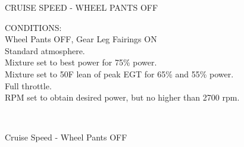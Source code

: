 \begin{figure}[t]
\begin{center}
\begin{perfhdr}CRUISE SPEED - WHEEL PANTS OFF\\
\end{perfhdr}

\begin{minipage}{5in}
  \begin{flushleft}
    CONDITIONS:\\
    Wheel Pants OFF, Gear Leg Fairings ON\\
    Standard atmosphere.\\
    Mixture set to best power for 75\% power.\\
    Mixture set to 50\textdegree F lean of peak EGT for 65\% and 55\% power.\\
    Full throttle.\\
    RPM set to obtain desired power, but no higher than 2700 rpm.\\
    \end{flushleft}
\end{minipage}\\
\vspace{5ex}

\end{center}  %
\caption{Cruise Speed - Wheel Pants OFF}
\label{Cruise-speed-WP-OFF}
\end{figure}


